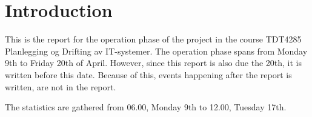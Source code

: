 \section{Introduction}
This is the report for the operation phase of the project in the course
TDT4285 Planlegging og Drifting av IT-systemer. The operation phase
spans from Monday 9th to Friday 20th of April. However, since this
report is also due the 20th, it is written before this date. Because of
this, events happening after the report is written, are not in the
report. 

The statistics are gathered from 06.00, Monday 9th to 12.00, Tuesday 17th.
